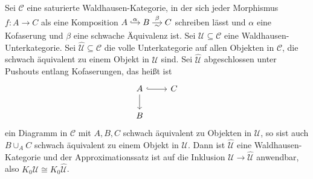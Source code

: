 \begin{bemerkung}
	Sei $\mathcal{C}$ eine saturierte Waldhausen-Kategorie, in der sich jeder Morphismus $f \colon A \to C$ als eine Komposition \(
		\begin{tikzcd}[cramped,sep=small]
			A \rar[hook,"\alpha"] & B \rar["\sim"',"\beta"] & C
		\end{tikzcd}
	\)
	schreiben lässt und $\alpha$ eine Kofaserung und $\beta$ eine schwache Äquivalenz ist.
	Sei $\mathcal{U} \subseteq \mathcal{C}$ eine Waldhausen-Unterkategorie.
	Sei $\hat{\mathcal{U}} \subseteq \mathcal{C}$ die volle Unterkategorie auf allen Objekten in $\mathcal{C}$, die schwach äquivalent zu einem Objekt in $\mathcal{U}$ sind.
	Sei $\hat{\mathcal{U}}$ abgeschlossen unter Pushouts entlang Kofaserungen, das heißt ist 
	\[
		\begin{tikzcd}
			A \dar \rar[hook] & C  \\
			B
		\end{tikzcd}
	\]
	ein Diagramm in $\mathcal{C}$ mit $A,B,C$ schwach äquivalent zu Objekten in $\mathcal{U}$, so sist auch $B \cup_A C$ schwach äquivalent zu einem Objekt in $\mathcal{U}$.
	Dann ist $\hat{\mathcal{U}}$ eine Waldhausen-Kategorie und der Approximationssatz ist auf die Inklusion $\mathcal{U} \to \hat{\mathcal{U}}$ anwendbar, also $K_0 \mathcal{U} \cong K_0 \hat{\mathcal{U}}$.
\end{bemerkung}

